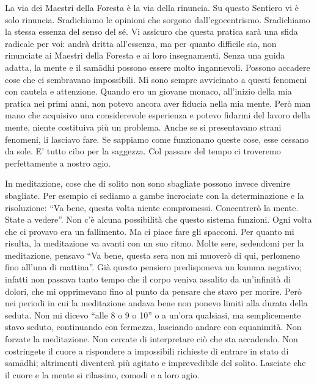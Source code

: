 La via dei Maestri della Foresta è la via della rinuncia. Su questo
Sentiero vi è solo rinuncia. Sradichiamo le opinioni che sorgono
dall'egocentrismo. Sradichiamo la stessa essenza del senso del sé. Vi
assicuro che questa pratica sarà una sfida radicale per voi: andrà
dritta all'essenza, ma per quanto difficile sia, non rinunciate ai
Maestri della Foresta e ai loro insegnamenti. Senza una guida adatta, la
mente e il samādhi possono essere molto ingannevoli. Possono accadere
cose che ci sembravano impossibili. Mi sono sempre avvicinato a questi
fenomeni con cautela e attenzione. Quando ero un giovane monaco,
all'inizio della mia pratica nei primi anni, non potevo ancora aver
fiducia nella mia mente. Però man mano che acquisivo una considerevole
esperienza e potevo fidarmi del lavoro della mente, niente costituiva
più un problema. Anche se si presentavano strani fenomeni, li lasciavo
fare. Se sappiamo come funzionano queste cose, esse cessano da sole. E'
tutto cibo per la saggezza. Col passare del tempo ci troveremo
perfettamente a nostro agio.

In meditazione, cose che di solito non sono sbagliate possono invece
divenire sbagliate. Per esempio ci sediamo a gambe incrociate con la
determinazione e la risoluzione: ``Va bene, questa volta niente
compromessi. Concentrerò la mente. State a vedere''. Non c'è alcuna
possibilità che questo sistema funzioni. Ogni volta che ci provavo era
un fallimento. Ma ci piace fare gli spacconi. Per quanto mi risulta, la
meditazione va avanti con un suo ritmo. Molte sere, sedendomi per la
meditazione, pensavo ``Va bene, questa sera non mi muoverò di qui,
perlomeno fino all'una di mattina''. Già questo pensiero predisponeva un
kamma negativo; infatti non passava tanto tempo che il corpo veniva
assalito da un'infinità di dolori, che mi opprimevano fino al punto da
pensare che stavo per morire. Però nei periodi in cui la meditazione
andava bene non ponevo limiti alla durata della seduta. Non mi dicevo
``alle 8 o 9 o 10'' o a un'ora qualsiasi, ma semplicemente stavo seduto,
continuando con fermezza, lasciando andare con equanimità. Non forzate
la meditazione. Non cercate di interpretare ciò che sta accadendo. Non
costringete il cuore a rispondere a impossibili richieste di entrare in
stato di samādhi; altrimenti diventerà più agitato e imprevedibile del
solito. Lasciate che il cuore e la mente si rilassino, comodi e a loro
agio.


